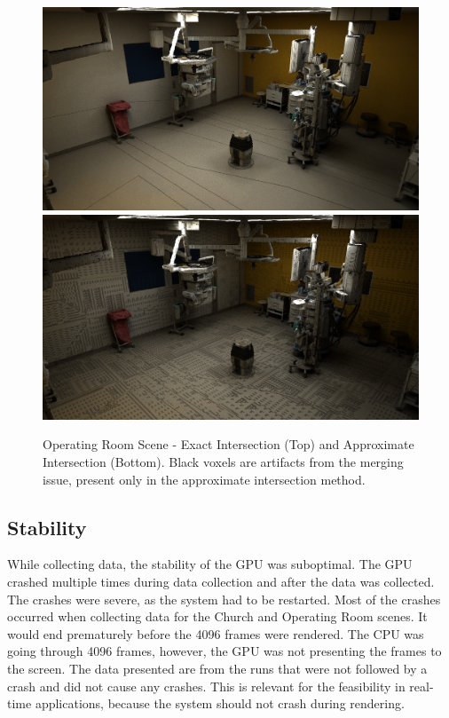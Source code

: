 \documentclass[12pt]{article}
\begin{document}
\begin{figure}[H]
    \begin{center}
        \includegraphics[scale=0.25]{OperationRoom.png}
        \smallbreak
        \includegraphics[scale=0.25]{OperationRoom-Merging}
    \end{center}
    \caption{
        Operating Room Scene - Exact Intersection (Top) and Approximate Intersection (Bottom).
        Black voxels are artifacts from the merging issue, present only in the approximate intersection method.
    }
    \label{fig:Scenes-Merging}
\end{figure}

\subsection{Stability}

While collecting data, the stability of the GPU was suboptimal. The GPU crashed multiple times
during data collection and after the data was collected.
The crashes were severe, as the system had to be restarted. Most of the crashes occurred
when collecting data for the Church and Operating Room scenes. It would end prematurely before the 4096 frames were rendered.
The CPU was going through 4096 frames, however, the GPU was not presenting the frames to the screen.
The data presented are from the runs that were not followed by a crash and did not cause any crashes.
This is relevant for the feasibility in real-time applications, because the system should not crash during rendering.
\end{document}
